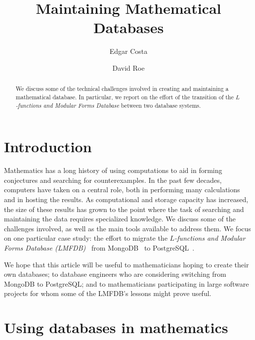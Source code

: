 \documentclass{amsart}
\begin{document}
\title{Maintaining Mathematical Databases}

\author{Edgar Costa}
\address{Department of Mathematics, Massachusetts Institute of Technology, Cambridge, MA 02139, USA}
\author{David Roe}
\address{Department of Mathematics, Massachusetts Institute of Technology, Cambridge, MA 02139, USA}

\begin{abstract}
We discuss some of the technical challenges involved in creating and maintaining a mathematical database.
In particular, we report on the effort of the transition of the \emph{$L$-functions and Modular Forms Database} between two database systems.
\end{abstract}

\maketitle

\section{Introduction}

Mathematics has a long history of using computations to aid in forming conjectures and searching for counterexamples.
In the past few decades, computers have taken on a central role, both in performing many calculations and in hosting the results.
As computational and storage capacity has increased, the size of these results has grown to the point where the task of searching and maintaining the data requires specialized knowledge.
We discuss some of the challenges involved, as well as the main tools available to address them.
We focus on one particular case study: the effort to migrate the \emph{$L$-functions and Modular Forms Database (LMFDB)}~\cite{lmfdb} from MongoDB~\cite{mongo} to PostgreSQL~\cite{postgres}.


We hope that this article will be useful to mathematicians hoping to create their own databases; to database engineers who are considering switching from MongoDB to PostgreSQL; and to mathematicians participating in large software projects for whom some of the LMFDB's lessons might prove useful.

\section{Using databases in mathematics}
\end{document}
